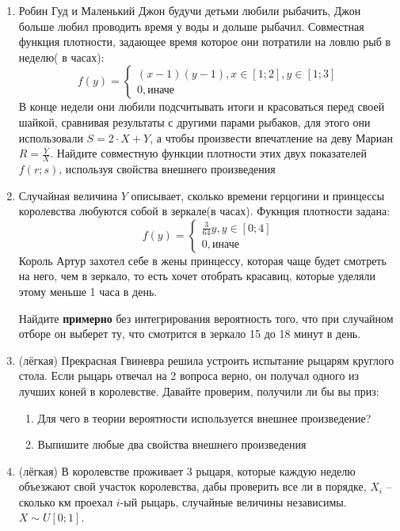 \documentclass[a4paper,12pt]{article}
\begin{document}
\begin{enumerate} %
\item Робин Гуд и Маленький Джон будучи детьми любили рыбачить, Джон больше любил проводить время у воды и дольше рыбачил. Совместная функция плотности, задающее время которое они потратили на ловлю рыб в неделю( в часах):
\[
   f(y)=
   \begin{cases}
   (x-1)(y-1),  x\in [1;2] ,y \in{[1;3]} \\
    0, \text{иначе}
    \end{cases}
\]
В конце недели они любили подсчитывать итоги и красоваться перед своей шайкой, сравнивая результаты с другими парами рыбаков, для этого они использовали $S=2 \cdot X+Y$, а чтобы произвести впечатление на деву Мариан $R=\frac{Y}{X}$. Найдите совместную функции плотности этих двух показателей $f(r;s)$, используя свойства внешнего произведения
\item
Случайная величина $Y$ описывает, сколько времени герцогини и принцессы королевства любуются собой в зеркале(в часах). Фукнция плотности задана:
\[
   f(y)=
   \begin{cases}
   \frac{3}{64}y,  y \in{[0;4]} \\
    0, \text{иначе}
    \end{cases}
\]
Король Артур захотел себе в жены принцессу, которая чаще будет смотреть на него, чем в зеркало, то есть хочет отобрать красавиц, которые уделяли этому меньше 1 часа в день.

Найдите \textbf{примерно} без интегрирования вероятность того, что при случайном отборе он выберет ту, что смотрится в зеркало 15 до 18 минут в день.

\item (лёгкая)
Прекрасная Гвиневра решила устроить испытание рыцарям круглого стола. Если рыцарь отвечал на 2 вопроса верно, он получал одного из лучших коней в королевстве. Давайте проверим, получили ли бы вы приз:
\begin{enumerate}
\item Для чего в теории вероятности используется внешнее произведение?
\item Выпишите любые два свойства внешнего произведения
\end{enumerate}
\item (лёгкая) В королевстве проживает 3 рыцаря, которые каждую неделю объезжают свой участок королевства, дабы проверить все ли в порядке, $X_i$ – сколько км проехал $i$-ый рыцарь, случайные величины независимы. $X\sim U[0;1]$.


\end{enumerate}
\end{document}
